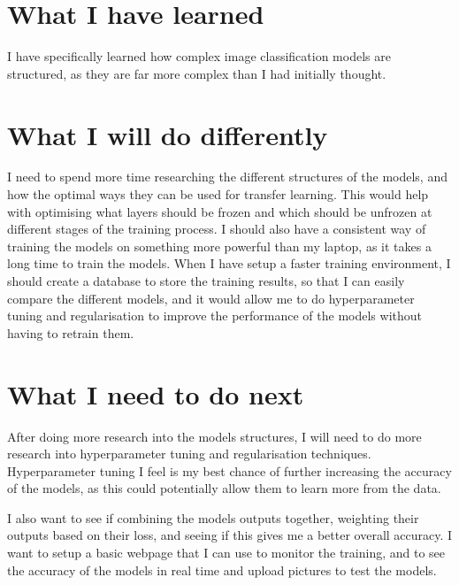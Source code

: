 \documentclass[]{final_report}
\begin{document}
\section{What I have learned}
I have specifically learned how complex image classification models are structured, as they are far more complex than I had initially thought.

\section{What I will do differently}
I need to spend more time researching the different structures of the models, and how the optimal ways they can be used for transfer learning.
This would help with optimising what layers should be frozen and which should be unfrozen at different stages of the training process.
I should also have a consistent way of training the models on something more powerful than my laptop, as it takes a long time to train the models.
When I have setup a faster training environment, I should create a database to store the training results, so that I can easily compare the different models,
and it would allow me to do hyperparameter tuning and regularisation to improve the performance of the models without having to retrain them.

\section{What I need to do next}
After doing more research into the models structures, I will need to do more research into hyperparameter tuning and regularisation techniques.
Hyperparameter tuning I feel is my best chance of further increasing the accuracy of the models, as this could potentially allow them to learn more from the data.

I also want to see if combining the models outputs together, weighting their outputs based on their loss, and seeing if this gives me a better overall accuracy.
I want to setup a basic webpage that I can use to monitor the training, and to see the accuracy of the models in real time and upload pictures to test the models.

\newpage
\printbibliography
\label{endpage}
\end{document}
